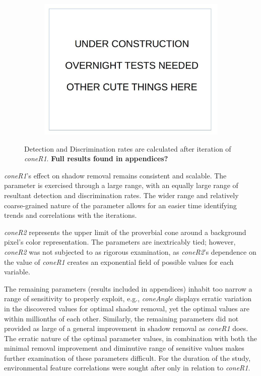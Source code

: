 \documentclass[12pt]{report}
\begin{document}
\begin{figure}
\begin{subfigure}{.49\linewidth}
  \caption{}
\end{subfigure}
\hfill
\begin{subfigure}{.49\linewidth}
  \includegraphics[width=1\linewidth]{figures/placeholder.jpg}
  \caption{}
\end{subfigure}

\caption{Detection and Discrimination rates are calculated after iteration of \textit{coneR1}. \textbf{Full results found in appendices?}}
\label{fig:coneR1_iterate}
\end{figure}

\textit{coneR1}'s effect on shadow removal remains consistent and scalable. The parameter is exercised through a large range, with an equally large range of resultant detection and discrimination rates. The wider range and relatively coarse-grained nature of the parameter allows for an easier time identifying trends and correlations with the iterations. 

\textit{coneR2} represents the upper limit of the proverbial cone around a background pixel's color representation. The parameters are inextricably tied; however, \textit{coneR2} was not subjected to as rigorous examination, as \textit{coneR2}'s dependence on the value of \textit{coneR1} creates an exponential field of possible values for each variable. 

The remaining parameters (results included in appendices) inhabit too narrow a range of sensitivity to properly exploit, e.g., \textit{coneAngle} displays erratic variation in the discovered values for optimal shadow removal, yet the optimal values are within millionths of each other. Similarly, the remaining parameters did not provided as large of a general improvement in shadow removal as \textit{coneR1} does. The erratic nature of the optimal parameter values, in combination with both the minimal removal improvement and diminutive range of sensitive values makes further examination of these parameters difficult. For the duration of the study, environmental feature correlations were sought after only in relation to \textit{coneR1}.
\end{document}
